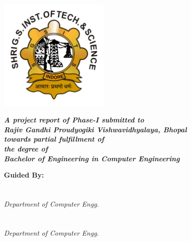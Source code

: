 \begin{titlepage}
    \centering
    \LARGE
    \textbf{\projectTitle}
    
    \Large
    \textit{\projectSubtitle}
    
    \vspace*{0.7cm}
    
    \includegraphics[width=0.4\textwidth]{images/logo.png}
    
    \vspace*{0.7cm}
    
    \textit{\textbf{A project report of Phase-I submitted to\\
    Rajiv Gandhi Proudyogiki Vishwavidhyalaya, Bhopal \\
    towards partial fulfillment of \\
    the degree of \\ 
    Bachelor of Engineering in Computer Engineering}}
    
    
    \vspace*{\fill}
    \large
    \begin{minipage}[t]{0.45\textwidth}
    \flushleft
    \textbf{Guided By:\\}
    \guide \\
    \desigGuide \\
    \emph{Department of Computer Engg.} \\
    \vspace*{0.5cm}
    \coguide \\
    \desigCoGuide \\
    \emph{Department of Computer Engg.} \\
    \end{minipage}
    \hfill
    \begin{minipage}[t]{0.45\textwidth}
    

\end{minipage}
\end{titlepage}
